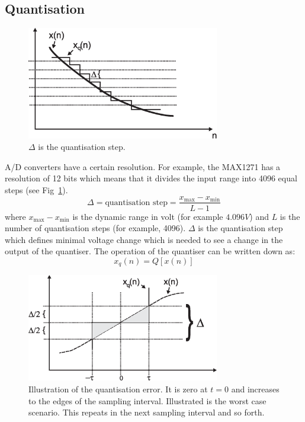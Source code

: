 \documentclass[12pt,a4paper]{article}
\begin{document}
\subsection{Quantisation}
\begin{figure}[!hbt]
\begin{center}
\mbox{\includegraphics[width=0.75\textwidth]{quant_overv}}
\end{center}
\caption{$\Delta$ is the quantisation step.
\label{quant_overv}}
\end{figure}
A/D converters have a certain resolution. For example, the MAX1271 has a
resolution of 12 bits which means that it divides the input range into
4096 equal steps (see Fig~\ref{quant_overv}).
\begin{equation}
\Delta = \mbox{quantisation step} = 
\frac{x_{\mbox{max}} - x_{\mbox{min}}}{L - 1}
\end{equation}
where $x_{\mbox{max}} - x_{\mbox{min}}$ is the dynamic range in volt
(for example $4.096V$) and $L$ is the number of quantisation steps
(for example, 4096). $\Delta$ is the quantisation step which defines
minimal voltage change which is needed to see a change in the output
of the quantiser. The operation of the quantiser can be written down
as:
\begin{equation}
x_{q}(n) = Q[x(n)]
\end{equation}

\begin{figure}[!hbt]
\begin{center}
\mbox{\includegraphics[width=0.75\textwidth]{quant_err}}
\end{center}
\caption{Illustration of the quantisation error. It is zero at $t=0$
and increases to the edges of the sampling interval. Illustrated
is the worst case scenario. This repeats in the next sampling interval
and so forth.
\label{quant_err}}
\end{figure}
\end{document}
